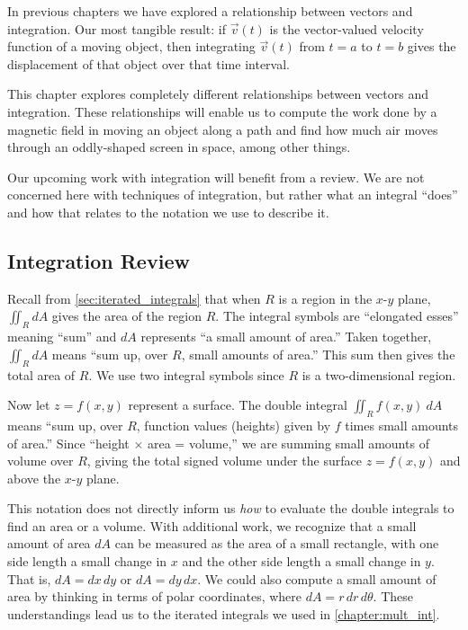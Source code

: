In previous chapters we have explored a relationship between vectors and integration. Our most tangible result: if $\vec v(t)$ is the vector-valued velocity function of a moving object, then integrating $\vec v(t)$ from $t=a$ to $t=b$ gives the displacement of that object over that time interval.

This chapter explores completely different relationships between vectors and integration. These relationships will enable us to compute the work done by a magnetic field in moving an object along a path and find how much air moves through an oddly-shaped screen in space, among other things. 

Our upcoming work with integration will benefit from a review. We are not concerned here with techniques of integration, but rather what an integral ``does'' and how that relates to the notation we use to describe it.

\subsection{Integration Review}

Recall from \autoref{sec:iterated_integrals} that when $R$ is a region in the $x$-$y$ plane, $ \iint_R dA$ gives the area of the region $R$. The integral symbols are ``elongated esses'' meaning ``sum'' and $dA$ represents ``a small amount of area.'' Taken together, $\iint_R dA$ means ``sum up, over $R$, small amounts of area.'' This sum then gives the total area of $R$. We use two integral symbols since $R$ is a two-dimensional region.

Now let $z=f(x,y)$ represent a surface. The double integral $\iint_R f(x,y)\ dA$ means ``sum up, over $R$, function values (heights) given by $f$ times small amounts of area.'' Since ``height $\times$ area = volume,'' we are summing small amounts of volume over $R$, giving the total signed volume under the surface $z=f(x,y)$ and above the $x$-$y$ plane.

This notation does not directly inform us \textit{how} to evaluate the double integrals to find an area or a volume. With additional work, we recognize that a small amount of area $dA$ can be measured as the area of a small rectangle, with one side length a small change in $x$ and the other side length a small change in $y$. That is, $dA = dx\,dy$ or $dA = dy\,dx$. We could also compute a small amount of area by thinking in terms of polar coordinates, where $dA = r\,dr\,d\theta$. These understandings lead us to the iterated integrals we used in \autoref{chapter:mult_int}.

